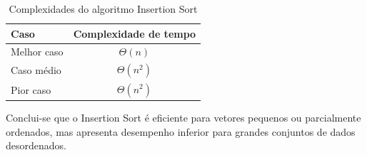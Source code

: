 \begin{table}[H]
    \centering
    \caption{Complexidades do algoritmo Insertion Sort}
    \label{tab:complexidade-insertion}
    \begin{tabular}{lc}
        \hline
        \textbf{Caso} & \textbf{Complexidade de tempo} \\
        \hline
        Melhor caso & $\Theta(n)$ \\
        Caso médio & $\Theta(n^2)$ \\
        Pior caso & $\Theta(n^2)$ \\
        \hline
    \end{tabular}
\end{table}

Conclui-se que o Insertion Sort é eficiente para vetores pequenos ou
parcialmente ordenados, mas apresenta desempenho inferior para grandes
conjuntos de dados desordenados.
